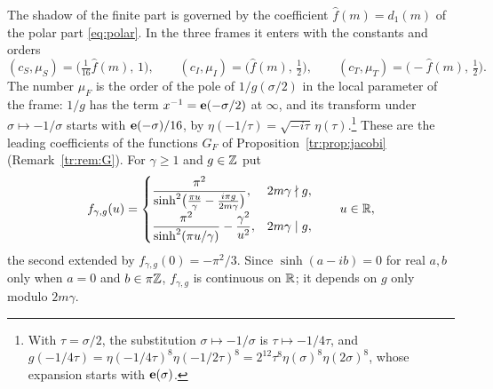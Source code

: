 The shadow of the finite part is governed by the coefficient $\hat f(m)=d_1(m)$ of the polar part \eqref{eq:polar}. In the three frames it enters with the constants and orders
\begin{equation}\label{eq:mockdata}
(c_S,\mu_S)=\big(\tfrac{1}{16}\hat f(m),\,1\big),\qquad (c_I,\mu_I)=\big(\hat f(m),\,\tfrac12\big),\qquad (c_T,\mu_T)=\big(-\hat f(m),\,\tfrac12\big).
\end{equation}
The number $\mu_F$ is the order of the pole of $1/g(\sigma/2)$ in the local parameter of the frame: $1/g$ has the term $x^{-1}=\mathbf e(-\sigma/2)$ at $\infty$, and its transform under $\sigma\mapsto-1/\sigma$ starts with $\mathbf e(-\sigma)/16$, by $\eta(-1/\tau)=\sqrt{-i\tau}\,\eta(\tau)$.\footnote{With $\tau=\sigma/2$, the substitution $\sigma\mapsto-1/\sigma$ is $\tau\mapsto-1/4\tau$, and $g(-1/4\tau)=\eta(-1/4\tau)^8\eta(-1/2\tau)^8=2^{12}\tau^8\eta(\sigma)^8\eta(2\sigma)^8$, whose expansion starts with $\mathbf e(\sigma)$.} These are the leading coefficients of the functions $G_F$ of Proposition~\ref{tr:prop:jacobi} (Remark~\ref{tr:rem:G}). For $\gamma\ge1$ and $g\in\mathbb{Z}$ put
\[
f_{\gamma,g}(u)=\begin{cases}\dfrac{\pi^2}{\sinh^2\!\big(\frac{\pi u}{\gamma}-\frac{i\pi g}{2m\gamma}\big)},& 2m\gamma\nmid g,\\[2.2ex]
\dfrac{\pi^2}{\sinh^2(\pi u/\gamma)}-\dfrac{\gamma^2}{u^2},& 2m\gamma\mid g,\end{cases}\qquad u\in\mathbb{R},
\]
the second extended by $f_{\gamma,g}(0)=-\pi^2/3$. Since $\sinh(a-ib)=0$ for real $a,b$ only when $a=0$ and $b\in\pi\mathbb{Z}$, $f_{\gamma,g}$ is continuous on $\mathbb{R}$; it depends on $g$ only modulo $2m\gamma$.

